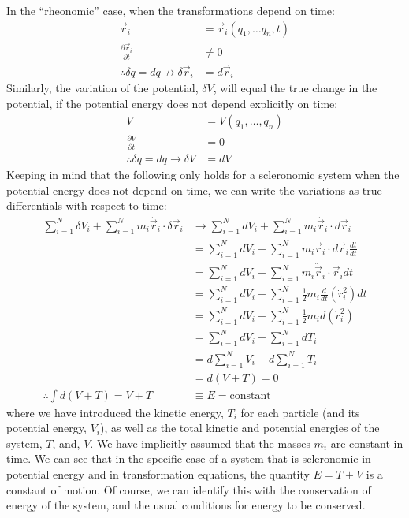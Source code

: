 In the ``rheonomic'' case, when the transformations depend on time:
\begin{align}
\vec{r}_i&=\vec{r}_i(q_1,\dots q_n,t)\nonumber\\
\frac{\partial \vec{r}_i}{\partial t}&\neq 0\nonumber\\
\therefore \delta q=dq\not\to  \delta \vec{r}_i&= d\vec{r}_i\nonumber
\end{align}
Similarly, the variation of the potential, $\delta V$, will equal the true change in the potential, if the potential energy does not depend explicitly on time:
\begin{align}
V&=V(q_1,\dots ,q_n)\nonumber\\
\frac{\partial V}{\partial t}&=0\nonumber\\
\therefore \delta q=dq\to  \delta V&=dV\nonumber
\end{align}
Keeping in mind that the following only holds for a scleronomic system when the potential energy does not depend on time, we can write the variations as true differentials with respect to time:
\begin{align}
\sum_{i=1}^N\delta V_i  +\sum_{i=1}^N m_i\ddot{\vec{r}}_i \cdot\delta\vec{r}_i&\to \sum_{i=1}^N dV_i +\sum_{i=1}^N m_i\ddot{\vec{r}}_i\cdot d\vec{r}_i\nonumber\\
&=\sum_{i=1}^N dV_i+\sum_{i=1}^N m_i\ddot{\vec{r}}_i\cdot d\vec{r}_i \frac{dt}{dt}\nonumber\\
&=\sum_{i=1}^N dV_i+\sum_{i=1}^N m_i\ddot{\vec{r}}_i\cdot \dot{\vec{r}}_i dt\nonumber\\
&=\sum_{i=1}^N dV_i+\sum_{i=1}^N \frac{1}{2}m_i\frac{d}{dt}(\dot{r}_i^2) dt\nonumber\\
&=\sum_{i=1}^N dV_i+\sum_{i=1}^N \frac{1}{2}m_i d(\dot{r}_i^2)\nonumber\\
&=\sum_{i=1}^N dV_i+\sum_{i=1}^N dT_i\nonumber\\
&=d\sum_{i=1}^N V_i+d\sum_{i=1}^N T_i\nonumber\\
&=d(V+T)=0\nonumber\\
\therefore \int d(V+T)=V+T &\equiv E = \text{constant}
\end{align}
where we have introduced the kinetic energy, $T_i$ for each particle (and its potential energy, $V_i$), as well as the total kinetic and potential energies of the system, $T$, and, $V$. We have implicitly assumed that the masses $m_i$ are constant in time. We can see that in the specific case of a system that is scleronomic in potential energy and in transformation equations, the quantity $E=T+V$ is a constant of motion. Of course, we can identify this with the conservation of energy of the system, and the usual conditions for energy to be conserved.

